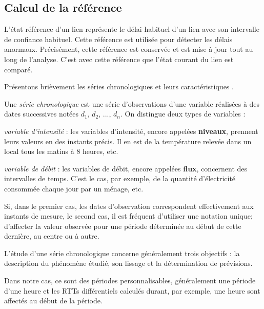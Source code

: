 \subsection{Calcul de la référence} \label{reference-lissage}
L'état référence d'un lien représente le délai habituel d'un lien avec son intervalle de confiance habituel. Cette référence est utilisée pour détecter les délais anormaux. Précisément, cette référence est conservée  et  est mise à jour tout au long de l'analyse. C'est avec cette référence que l'état courant du lien est comparé. 

Présentons  brièvement  les séries chronologiques et leurs caractéristiques \cite{elementdestatistiques}.   
\begin{tcolorbox}[before upper={\parindent15pt}]
	Une \textit{série chronologique} est une série d'observations d'une variable réalisées à des dates successives notées $d_1$, $d_2$, ..., $d_n$. On distingue deux types de variables :
	
	\textit{variable  d'intensité} : les variables d'intensité, encore appelées \textbf{niveaux}, prennent leurs valeurs en des instants précis. Il en est de la température relevée dans un local tous les matins à $8$ heures, etc.
	
	\textit{variable de débit} : les variables de débit, encore appelées \textbf{flux}, concernent des intervalles de temps. C'est le cas, par exemple, de la quantité d'électricité consommée chaque jour par un ménage, etc.
	
	Si, dans le premier cas, les dates d'observation correspondent effectivement aux instants de mesure, le second cas, il est fréquent d'utiliser une notation unique; d'affecter la valeur observée pour une période déterminée au début de cette dernière, au centre ou à autre.
	
	L'étude d'une série chronologique concerne généralement trois objectifs : la description du phénomène étudié, son lissage et la détermination de prévisions.
\end{tcolorbox}

Dans notre cas, ce sont des périodes personnalisables, généralement une période d'une heure et les RTTs différentiels calculés durant, par exemple, une heure sont affectés au début de la période.

